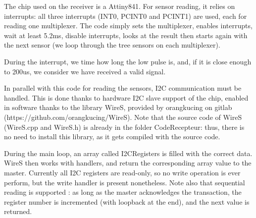 \documentclass[a4paper,11pt]{article}
\begin{document}
\indent \par The chip used on the receiver is a Attiny841. For sensor reading, it relies on interrupts: all three interrupts (INT0, PCINT0 and PCINT1) are used, each for reading one multiplexer. The code simply sets the multiplexer, enables interrupts, wait at least 5.2ms, disable interrupts, looks at the result then starts again with the next sensor (we loop through the tree sensors on each multiplexer).
\par During the interrupt, we time how long the low pulse is, and, if it is close enough to 200us, we consider we have received a valid signal.
\par In parallel with this code for reading the sensors, I2C communication must be handled. This is done thanks to hardware I2C slave support of the chip, enabled in software thanks to the library WireS, provided by orangkucing on gitlab (https://github.com/orangkucing/WireS). Note that the source code of WireS (WireS.cpp and WireS.h) is already in the folder CodeRecepteur: thus, there is no need to install this library, as it gets compiled with the source code.
\par During the main loop, an array called I2CRegisters is filled with the correct data. WireS then works with handlers, and return the corresponding array value to the master. Currently all I2C registers are read-only, so no write operation is ever perform, but the write handler is present nonetheless. Note also that sequential reading is supported : as long as the master acknowledges the transaction, the register number is incremented (with loopback at the end), and the next value is returned.
\end{document}
